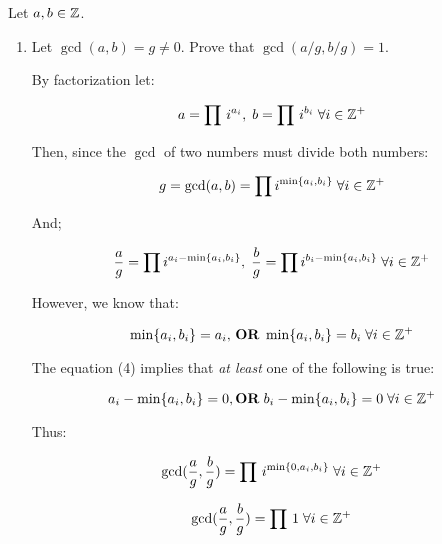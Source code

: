 \begin{problem}
Let $a,b \in \mathbb{Z}$.
\begin{enumerate}\renewcommand{\itemsep}{3mm}
\item Let $\gcd(a,b)=g \neq 0$.  Prove that $\gcd(a/g,b/g)=1$.

\noindent
\begin{Answer}

By factorization let:

\begin{equation}
  a=\prod\, i^{a_{i}}, \;b =\prod\, i^{b_{i}} \;\forall i \in \mathbb{Z}^{+}
\end{equation}

\noindent

Then, since the $\gcd$ of two numbers must divide both numbers:

\begin{equation}
  g=\gcd(a,b)=\prod i^{\min\{a_{i}, b_{i}\}} \;\forall i \in \mathbb{Z}^{+}
\end{equation}

And;

\begin{equation}
  \frac{a}{g}=\prod i^{a_{i}-\min\{a_{i}, b_{i}\}}, \;\frac{b}{g} =\prod i^{b_{i}-\min\{a_{i}, b_{i}\}} \;\forall i \in \mathbb{Z}^{+}
\end{equation}

However, we know that:

\begin{equation}
  \min\{a_{i}, b_{i}\} = a_{i},\, \mathbf{OR} \;\min\{a_{i}, b_{i}\} = b_{i} \;\forall i \in \mathbb{Z}^{+}
\end{equation}

The equation (4) implies that \textit{at least} one of the following is true:

\begin{equation}
  a_{i}-\min\{a_{i}, b_{i}\} = 0, \mathbf{OR} \;b_{i}-\min\{a_{i}, b_{i}\} = 0 \;\forall i \in \mathbb{Z}^{+}
\end{equation}

Thus:

\begin{equation}
  \gcd(\frac{a}{g},\frac{b}{g})=\prod \, i^{\min\{0, a_{i}, b_{i}\}} \;\forall i \in \mathbb{Z}^{+}
\end{equation}

\begin{equation}
  \gcd(\frac{a}{g},\frac{b}{g})=\prod \, 1 \;\forall i \in \mathbb{Z}^{+}
\end{equation}


\end{Answer}
\end{enumerate}
\end{problem}
